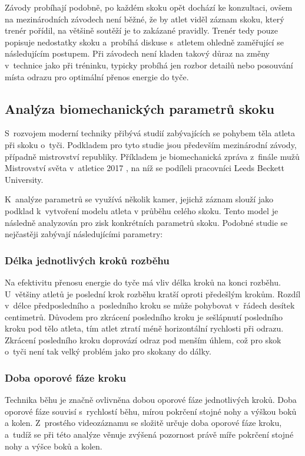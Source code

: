 Závody probíhají podobně, po každém skoku opět dochází ke konzultaci, ovšem na mezinárodních závodech není běžné, že by atlet viděl záznam skoku, který trenér pořídil, na většině soutěží je to zakázané pravidly. Trenér tedy pouze popisuje nedostatky skoku a~probíhá diskuse s~atletem ohledně zaměřující se následujícím postupem. Při závodech není kladen takový důraz na změny v~technice jako při tréninku, typicky probíhá jen rozbor detailů nebo posouvání místa odrazu pro optimální přenos energie do tyče.

\subsection{Analýza biomechanických parametrů skoku}
\label{ssec:parametry}

S~rozvojem moderní techniky přibývá studií zabývajících se pohybem těla atleta při skoku o~tyči. Podkladem pro tyto studie jsou především mezinárodní závody, případně mistrovství republiky. Příkladem je biomechanická zpráva z~finále mužů Mistrovství světa v~atletice 2017 \citep{IAAF2017}, na níž se podíleli pracovníci Leeds Beckett University.

K~analýze parametrů se využívá několik kamer, jejichž záznam slouží jako podklad k~vytvoření modelu atleta v průběhu celého skoku. Tento model je následně analyzován pro zisk konkrétních parametrů skoku. Podobné studie se nejčastěji zabývají následujícími parametry:

\subsubsection{Délka jednotlivých kroků rozběhu}

Na efektivitu přenosu energie do tyče má vliv délka kroků na konci rozběhu. U~většiny atletů je poslední krok rozběhu kratší oproti předešlým krokům. Rozdíl v~délce předposledního a~posledního kroku se může pohybovat v~řádech desítek centimetrů. Důvodem pro zkrácení posledního kroku je sešlápnutí posledního kroku pod tělo atleta, tím atlet ztratí méně horizontální rychlosti při odrazu. Zkrácení posledního kroku doprovází odraz pod menším úhlem, což pro skok o~tyči není tak velký problém jako pro skokany do dálky.

\subsubsection{Doba oporové fáze kroku}

Technika běhu je značně ovlivněna dobou oporové fáze jednotlivých kroků. Doba oporové fáze souvisí s~rychlostí běhu, mírou pokrčení stojné nohy a výškou boků a kolen. Z~prostého videozáznamu se složitě určuje doba oporové fáze kroku, a~tudíž se při této analýze věnuje zvýšená pozornost právě míře pokrčení stojné nohy a výšce boků a kolen.

